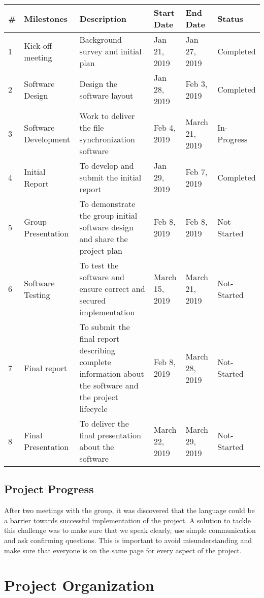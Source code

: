 \documentclass{article}
\begin{document}
\begin{center}
\begin{tabular}{ | m{1em} | m{2cm}| m{3cm} | m{1cm} | m{1cm} | m{2cm} |}
\hline
\textbf{\#} & \textbf{Milestones} & \textbf{Description} & \textbf{Start Date} & \textbf{End Date} & \textbf{Status}  \\
\hline
1 & Kick-off meeting & Background survey and initial plan & Jan 21, 2019 & Jan 27, 2019 & Completed \\
\hline
2 & Software Design  & Design the software layout & Jan 28, 2019 & Feb 3, 2019 & Completed \\
\hline
3 & Software Development & Work to deliver the file synchronization software & Feb 4, 2019 & March 21, 2019 & In-Progress \\
\hline
4 & Initial Report & To develop and submit the initial report & Jan 29, 2019 & Feb 7, 2019 & Completed \\
\hline
5 & Group Presentation & To demonstrate  the group initial software design and share the project plan & Feb 8, 2019 & Feb 8, 2019 & Not-Started \\
\hline
6 & Software Testing &  To test the software and ensure correct and secured implementation & March 15, 2019 & March 21, 2019 & Not-Started \\
\hline
7 & Final report & To submit the final report describing complete information about the software and the project lifecycle & Feb 8, 2019 & March 28, 2019 & Not-Started \\
\hline
8 & Final Presentation & To deliver the final presentation about the software & March 22, 2019 & March 29, 2019 & Not-Started \\
\hline
\end{tabular}
\end{center}

\subsection{Project Progress}
After two meetings with the group, it was discovered that the language could be a barrier towards successful implementation of the project. A solution to tackle this challenge was to make sure that we speak clearly, use simple communication and ask confirming questions. This is important to avoid misunderstanding and make sure that everyone is on the same page for every aspect of the project.

\section{Project Organization}
\end{document}
